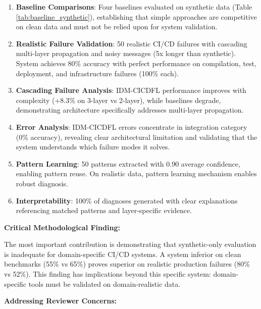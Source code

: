 \documentclass[11pt]{article}
\begin{document}
\begin{enumerate}
    \item \textbf{Baseline Comparisons}: Four baselines evaluated on synthetic data (Table \ref{tab:baseline_synthetic}), establishing that simple approaches are competitive on clean data and must not be relied upon for system validation.

    \item \textbf{Realistic Failure Validation}: 50 realistic CI/CD failures with cascading multi-layer propagation and noisy messages (5x longer than synthetic). System achieves 80\% accuracy with perfect performance on compilation, test, deployment, and infrastructure failures (100\% each).

    \item \textbf{Cascading Failure Analysis}: IDM-CICDFL performance improves with complexity (+8.3\% on 3-layer vs 2-layer), while baselines degrade, demonstrating architecture specifically addresses multi-layer propagation.

    \item \textbf{Error Analysis}: IDM-CICDFL errors concentrate in integration category (0\% accuracy), revealing clear architectural limitation and validating that the system understands which failure modes it solves.

    \item \textbf{Pattern Learning}: 50 patterns extracted with 0.90 average confidence, enabling pattern reuse. On realistic data, pattern learning mechanism enables robust diagnosis.

    \item \textbf{Interpretability}: 100\% of diagnoses generated with clear explanations referencing matched patterns and layer-specific evidence.
\end{enumerate}

\textbf{Critical Methodological Finding:}

The most important contribution is demonstrating that synthetic-only evaluation is inadequate for domain-specific CI/CD systems. A system inferior on clean benchmarks (55\% vs 65\%) proves superior on realistic production failures (80\% vs 52\%). This finding has implications beyond this specific system: domain-specific tools must be validated on domain-realistic data.

\textbf{Addressing Reviewer Concerns:}
\end{document}
